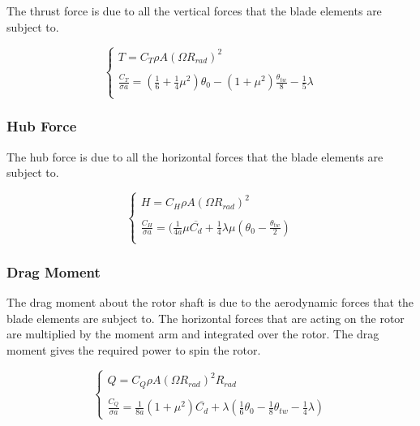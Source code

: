 \documentclass{thesisreport}
\begin{document}
The thrust force is due to all the vertical forces that the blade elements are subject to.

\begin{equation}\label{thrust_force}
\begin{cases}
T = C_T \rho A(\Omega R_{rad})^2\\
\\
\frac{C_T}{\sigma a} = (\frac{1}{6} + \frac{1}{4} \mu^2)\theta_0 - (1+\mu^2)\frac{\theta_{tw}}{8} - \frac{1}{5} \lambda \\
\end{cases}
\end{equation}

\subsubsection*{Hub Force}

The hub force is due to all the horizontal forces that the blade elements are subject to.

\begin{equation}
\begin{cases}
H = C_H \rho A(\Omega R_{rad})^2\\
\\
\frac{C_H}{\sigma a} = (\frac{1}{4a} \mu \overline{C_d} + \frac{1}{4} \lambda \mu (\theta_0 - \frac{\theta_{tw}}{2})\\
\end{cases}
\end{equation}

\subsubsection*{Drag Moment}

The drag moment about the rotor shaft is due to the aerodynamic forces that the blade elements are subject to. The horizontal forces that are acting on the rotor are multiplied by the moment arm and  integrated over the rotor. The drag moment gives the required power to spin the rotor.

\begin{equation}
\begin{cases}
	Q = C_Q \rho A (\Omega R_{rad})^2 R_{rad}\\
	\\
	\frac{C_Q}{\sigma a} = \frac{1}{8a}(1+\mu^2) \overline{C_d} + \lambda (\frac{1}{6} \theta_0 - \frac{1}{8} \theta_{tw} - \frac{1}{4} \lambda)
\end{cases}
\end{equation}
\end{document}
